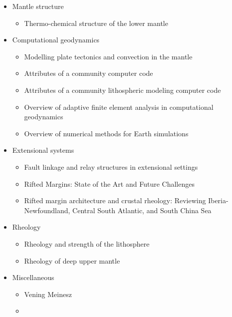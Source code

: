 \begin{itemize}
\item Mantle structure
   \begin{itemize}
   \item Thermo-chemical structure of the lower mantle \cite{dett07}
   \end{itemize}


\item Computational geodynamics
   \begin{itemize}
   \item Modelling plate tectonics and convection in the mantle \cite{mogz00}
   \item Attributes of a community computer code \cite{comc15}
   \item Attributes of a community lithospheric modeling computer code \cite{comc15}
   \item Overview of adaptive finite element analysis in computational geodynamics \cite{masm13}
   \item Overview of numerical methods for Earth simulations \cite{momd01}
   \end{itemize}

\item Extensional systems
   \begin{itemize}
   \item Fault linkage and relay structures in extensional settings \cite{foro16}
   \item Rifted Margins: State of the Art and Future Challenges \cite{pema19}\\
   \item Rifted margin architecture and crustal rheology: Reviewing
Iberia-Newfoundland, Central South Atlantic, and South China Sea \cite{brhc17}
   \end{itemize}

\item Rheology
   \begin{itemize}
   \item Rheology and strength of the lithosphere \cite{kirb83,buro11}
   \item Rheology of deep upper mantle \cite{kara10}
   \end{itemize}

\item Miscellaneous
   \begin{itemize}
   \item Vening Meinesz \cite{vlaa89}
   \item 
   \end{itemize}



\end{itemize}
